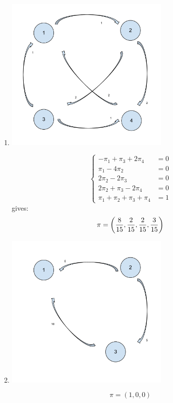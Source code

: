 \documentclass[12pt]{article}
\begin{document}
\begin{enumerate}
\begin{enumerate}
\item

\begin{center}
\includegraphics[width=8cm]{Markov_Chains_Ex_4-e.pdf}
\end{center}


$$ \begin{cases}
-\pi_1+\pi_3+2\pi_4&=0\\
\pi_1-4\pi_2&=0\\
2\pi_2-2\pi_3&=0\\
2\pi_2+\pi_3-2\pi_4&=0\\
\pi_1+\pi_2+\pi_3+\pi_4&=1
\end{cases}$$
gives:
$$\pi=\left({8\over15},{2\over15},{2\over15},{3\over15}\right)$$

\item

\begin{center}
\includegraphics[width=8cm]{Markov_Chains_Ex_4-f.pdf}
\end{center}

$$\pi=(1,0,0)$$


\end{enumerate}
\end{enumerate}
\end{document}
